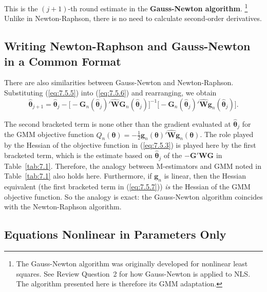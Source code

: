 This is the $(j+1)$-th round estimate in the \textbf{Gauss-Newton algorithm}.%
\footnote{The Gauss-Newton algorithm was originally developed for nonlinear least squares. See Review Question~2 for how Gauss-Newton is applied to NLS. The algorithm presented here is therefore its GMM adaptation.}
Unlike in Newton-Raphson, there is no need to calculate second-order derivatives.

\subsection*{Writing Newton-Raphson and Gauss-Newton in a Common Format}

There are also similarities between Gauss-Newton and Newton-Raphson. Substituting (\ref{eq:7.5.5}) into (\ref{eq:7.5.6}) and rearranging, we obtain
\begin{equation}
\label{eq:7.5.7}
\hat{\bm{\theta}}_{j+1} = \hat{\bm{\theta}}_j - \bigl[-\mathbf{G}_n(\hat{\bm{\theta}}_j)'\widehat{\mathbf{W}}\mathbf{G}_n(\hat{\bm{\theta}}_j)\bigr]^{-1}\bigl[-\mathbf{G}_n(\hat{\bm{\theta}}_j)'\widehat{\mathbf{W}}\mathbf{g}_n(\hat{\bm{\theta}}_j)\bigr].
\end{equation}

The second bracketed term is none other than the gradient evaluated at $\hat{\bm{\theta}}_j$ for the GMM objective function $Q_n(\bm{\theta}) = -\frac{1}{2}\mathbf{g}_n(\bm{\theta})'\widehat{\mathbf{W}}\mathbf{g}_n(\bm{\theta})$. The role played by the Hessian of the objective function in (\ref{eq:7.5.3}) is played here by the first bracketed term, which is the estimate based on $\hat{\bm{\theta}}_j$ of the $-\mathbf{G}'\mathbf{W}\mathbf{G}$ in Table~\ref{tab:7.1}. Therefore, the analogy between M-estimators and GMM noted in Table~\ref{tab:7.1} also holds here. Furthermore, if $\mathbf{g}_n$ is linear, then the Hessian equivalent (the first bracketed term in (\ref{eq:7.5.7})) \emph{is} the Hessian of the GMM objective function. So the analogy is exact: the Gauss-Newton algorithm coincides with the Newton-Raphson algorithm.

\subsection*{Equations Nonlinear in Parameters Only}

